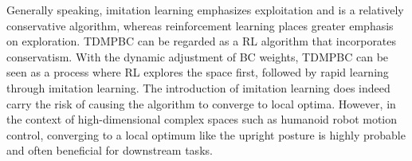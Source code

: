 Generally speaking, imitation learning \citep{zare2024survey} emphasizes exploitation and is a relatively conservative algorithm, whereas reinforcement learning places greater emphasis on exploration. 
TDMPBC can be regarded as a RL algorithm that incorporates conservatism. 
With the dynamic adjustment of BC weights, TDMPBC can be seen as a process where RL explores the space first, followed by rapid learning through imitation learning. 
The introduction of imitation learning does indeed carry the risk of causing the algorithm to converge to local optima. 
However, in the context of high-dimensional complex spaces such as humanoid robot motion control, converging to a local optimum like the upright posture is highly probable and often beneficial for downstream tasks.